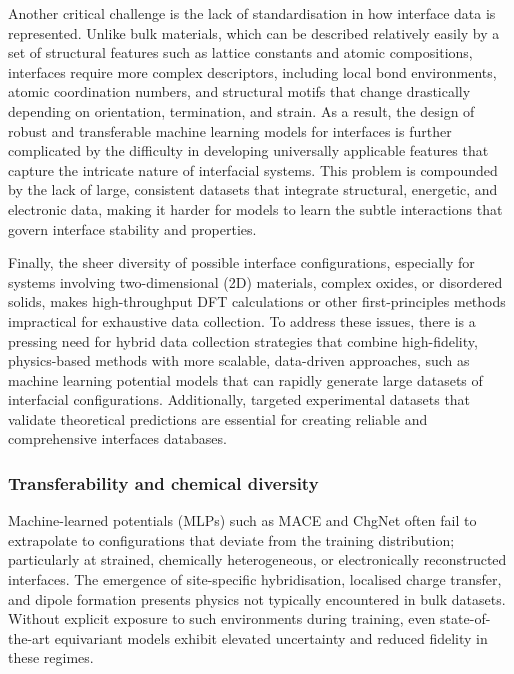 Another critical challenge is the lack of standardisation in how interface data is represented. Unlike bulk materials, which can be described relatively easily by a set of structural features such as lattice constants and atomic compositions, interfaces require more complex descriptors, including local bond environments, atomic coordination numbers, and structural motifs that change drastically depending on orientation, termination, and strain. As a result, the design of robust and transferable machine learning models for interfaces is further complicated by the difficulty in developing universally applicable features that capture the intricate nature of interfacial systems. This problem is compounded by the lack of large, consistent datasets that integrate structural, energetic, and electronic data, making it harder for models to learn the subtle interactions that govern interface stability and properties.

Finally, the sheer diversity of possible interface configurations, especially for systems involving two-dimensional (2D) materials, complex oxides, or disordered solids, makes high-throughput DFT calculations or other first-principles methods impractical for exhaustive data collection. To address these issues, there is a pressing need for hybrid data collection strategies that combine high-fidelity, physics-based methods with more scalable, data-driven approaches, such as machine learning potential models that can rapidly generate large datasets of interfacial configurations. Additionally, targeted experimental datasets that validate theoretical predictions are essential for creating reliable and comprehensive interfaces databases.

\subsubsection{Transferability and chemical diversity}

Machine-learned potentials (MLPs) such as MACE  and ChgNet often fail to extrapolate to configurations that deviate from the training distribution; particularly at strained, chemically heterogeneous, or electronically reconstructed interfaces. The emergence of site-specific hybridisation, localised charge transfer, and dipole formation presents physics not typically encountered in bulk datasets. Without explicit exposure to such environments during training, even state-of-the-art equivariant models exhibit elevated uncertainty and reduced fidelity in these regimes.

